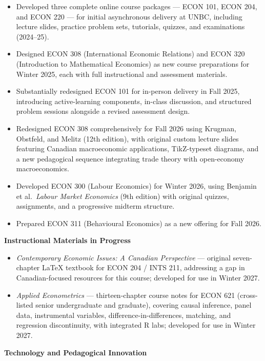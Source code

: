 \documentclass[11pt,letterpaper]{article}
\begin{document}
\begin{itemize}
  \item Developed three complete online course packages — ECON 101, ECON 204, and ECON 220 — for initial asynchronous delivery at UNBC, including lecture slides, practice problem sets, tutorials, quizzes, and examinations (2024--25).
  \item Designed ECON 308 (International Economic Relations) and ECON 320 (Introduction to Mathematical Economics) as new course preparations for Winter 2025, each with full instructional and assessment materials.
  \item Substantially redesigned ECON 101 for in-person delivery in Fall 2025, introducing active-learning components, in-class discussion, and structured problem sessions alongside a revised assessment design.
  \item Redesigned ECON 308 comprehensively for Fall 2026 using Krugman, Obstfeld, and Melitz (12th edition), with original custom lecture slides featuring Canadian macroeconomic applications, TikZ-typeset diagrams, and a new pedagogical sequence integrating trade theory with open-economy macroeconomics.
  \item Developed ECON 300 (Labour Economics) for Winter 2026, using Benjamin et al.\ \textit{Labour Market Economics} (9th edition) with original quizzes, assignments, and a progressive midterm structure.
  \item Prepared ECON 311 (Behavioural Economics) as a new offering for Fall 2026.
\end{itemize}

\vspace{4pt}
\textbf{Instructional Materials in Progress}

\begin{itemize}
  \item \textit{Contemporary Economic Issues: A Canadian Perspective} — original seven-chapter LaTeX textbook for ECON 204 / INTS 211, addressing a gap in Canadian-focused resources for this course; developed for use in Winter 2027.
  \item \textit{Applied Econometrics} — thirteen-chapter course notes for ECON 621 (cross-listed senior undergraduate and graduate), covering causal inference, panel data, instrumental variables, difference-in-differences, matching, and regression discontinuity, with integrated R labs; developed for use in Winter 2027.
\end{itemize}

\vspace{4pt}
\textbf{Technology and Pedagogical Innovation}
\end{document}
